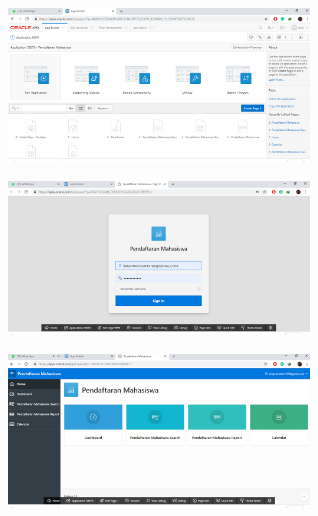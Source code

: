 \begin{figure}[H]
	\centering
	\includegraphics[width=8cm]{figures/9.png}
\end{figure}

\begin{figure}[H]
	\centering
	\includegraphics[width=8cm]{figures/10.png}
\end{figure}

\begin{figure}[H]
	\centering
	\includegraphics[width=8cm]{figures/11.png}
\end{figure}